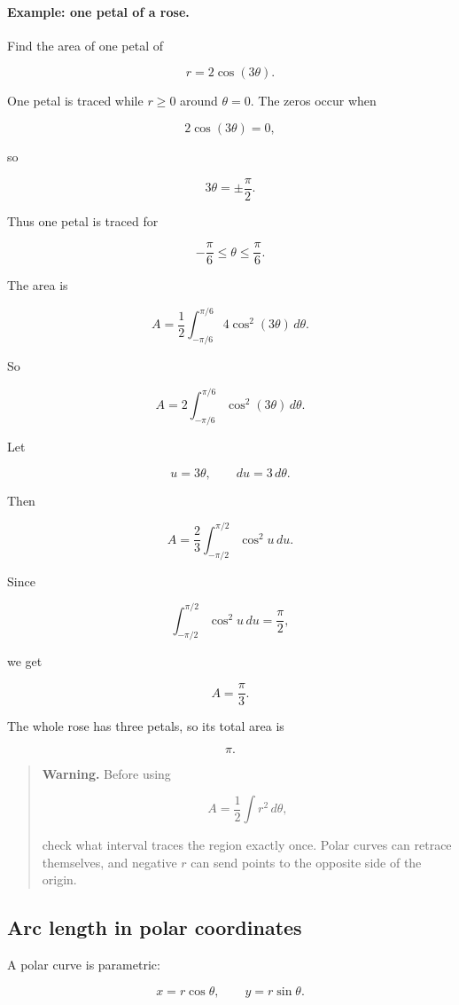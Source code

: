 \paragraph{Example: one petal of a rose.}
Find the area of one petal of

\[
r=2\cos(3\theta).
\]

One petal is traced while \(r\ge0\) around \(\theta=0\).  The zeros occur when

\[
2\cos(3\theta)=0,
\]

so

\[
3\theta=\pm\frac{\pi}{2}.
\]

Thus one petal is traced for

\[
-\frac{\pi}{6}\le\theta\le\frac{\pi}{6}.
\]

The area is

\[
A=\frac12\int_{-\pi/6}^{\pi/6}4\cos^2(3\theta)\,d\theta.
\]

So

\[
A=2\int_{-\pi/6}^{\pi/6}\cos^2(3\theta)\,d\theta.
\]

Let

\[
u=3\theta,
\qquad
du=3\,d\theta.
\]

Then

\[
A=\frac23\int_{-\pi/2}^{\pi/2}\cos^2 u\,du.
\]

Since

\[
\int_{-\pi/2}^{\pi/2}\cos^2u\,du=\frac{\pi}{2},
\]

we get

\[
\boxed{
A=\frac{\pi}{3}.
}
\]

The whole rose has three petals, so its total area is

\[
\pi.
\]

\begin{quote}
\textbf{Warning.}
Before using

\[
A=\frac12\int r^2\,d\theta,
\]

check what interval traces the region exactly once.  Polar curves can retrace themselves,
and negative \(r\) can send points to the opposite side of the origin.
\end{quote}

\subsection{Arc length in polar coordinates}
\label{subsec:arc-length-polar-coordinates}

A polar curve is parametric:

\[
x=r\cos\theta,
\qquad
y=r\sin\theta.
\]

